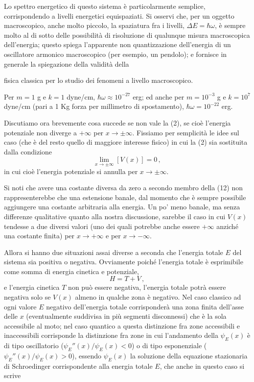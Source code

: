 \documentclass[11pt, a4paper]{book}
\numberwithin{equation}{section}
\begin{document}
Lo spettro energetico di questo sistema è particolarmente semplice, corrispondendo a livelli energetici equispaziati. Si osservi che, per un oggetto
macroscopico, anche molto piccolo, la spaziatura fra i livelli, $\Delta E = \hbar\omega$,
è sempre molto al di sotto delle possibilità di risoluzione di qualunque misura macroscopica dell'energia; questo spiega l'apparente non quantizzazione
dell'energia di un oscillatore armonico macroscopico (per esempio, un pendolo); e fornisce in generale la spiegazione della validità della


fisica classica per lo studio dei fenomeni a livello macroscopico.

Per $m = 1$ g e $k = 1$ dyne/cm, $\hbar\omega \approx 10^{-27}$ erg; ed anche
per $m = 10^{-3}$ g e $k = 10^7$ dyne/cm (pari a 1 Kg forza per millimetro
di spostamento), $\hbar\omega = 10^{-22}$ erg.

Discutiamo ora brevemente cosa succede se non vale la (2), se
cioè l'energia potenziale non diverge a $+\infty$ per $x \to \pm\infty$.
Fissiamo per semplicità le idee sul caso (che è del resto quello di maggiore interesse fisico) in cui la (2) sia sostituita dalla condizione
\begin{equation}
\lim_{x \to \pm\infty} \left[V(x)\right] = 0 \,, \tag{12}
\end{equation}
in cui cioè l'energia potenziale si annulla per $x \to \pm\infty$.

Si noti che avere una costante diversa da zero a secondo membro
della (12) non rappresenterebbe che una estensione banale, dal momento
che è sempre possibile aggiungere una costante arbitraria alla energia.
Un po' meno banale, ma senza differenze qualitative quanto alla nostra
discussione, sarebbe il caso in cui $V(x)$ tendesse a due diversi valori
(uno dei quali potrebbe anche essere $+\infty$ anziché una costante finita)
per $x \to +\infty$ e per $x \to -\infty$.

Allora si hanno due situazioni assai diverse a seconda che l'energia
totale $E$ del sistema sia positiva o negativa. Ovviamente poiché l'energia
totale è esprimibile come somma di energia cinetica e potenziale,
\begin{equation}
H = T + V \,, \tag{13}
\end{equation}
e l'energia cinetica $T$ non può essere negativa, l'energia totale potrà essere
negativa solo se $V(x)$ almeno in qualche zona è negativo. Nel caso classico
ad ogni valore $E$ negativo dell'energia totale corrisponderà una zona finita
dell'asse delle $x$ (eventualmente suddivisa in più segmenti disconnessi) che
è la sola accessibile al moto; nel caso quantico a questa distinzione fra zone
accessibili e inaccessibili corrisponde la distinzione fra zone in cui l'andamento della $\psi_E(x)$ è di tipo oscillatorio ($\psi_E''(x)/\psi_E(x) < 0$)
o di tipo esponenziale ($\psi_E''(x)/\psi_E(x) > 0$), essendo $\psi_E(x)$ la
soluzione della equazione stazionaria di Schroedinger corrispondente
alla energia totale $E$, che anche in questo caso si scrive
\end{document}
